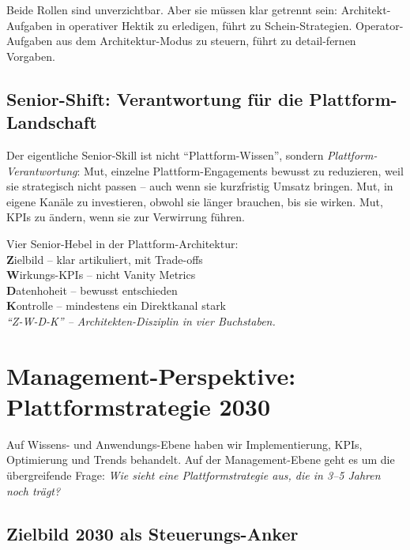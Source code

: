 \documentclass[11pt,a4paper,oneside]{article}
\newcommand{\caveatfontfallback}{\itshape}
\newcommand\caveatfont{\caveatfontfallback}%
\newcommand{\akzent}[1]{{\caveatfont\color{lpAmber}#1}}
\begin{document}
\medskip

\noindent Beide Rollen sind unverzichtbar. Aber sie müssen klar getrennt sein: Architekt-Aufgaben in operativer Hektik zu erledigen, führt zu Schein-Strategien. Operator-Aufgaben aus dem Architektur-Modus zu steuern, führt zu detail-fernen Vorgaben.

\subsection{Senior-Shift: Verantwortung für die Plattform-Landschaft}

Der eigentliche Senior-Skill ist nicht ``Plattform-Wissen'', sondern \emph{Plattform-Verantwortung}: Mut, einzelne Plattform-Engagements bewusst zu reduzieren, weil sie strategisch nicht passen -- auch wenn sie kurzfristig Umsatz bringen. Mut, in eigene Kanäle zu investieren, obwohl sie länger brauchen, bis sie wirken. Mut, KPIs zu ändern, wenn sie zur Verwirrung führen.

\begin{eselsbox}[Eselsbrücke: \akzent{Z-W-D-K}]
Vier Senior-Hebel in der Plattform-Architektur:\\[2pt]
\textbf{Z}ielbild -- klar artikuliert, mit Trade-offs\\
\textbf{W}irkungs-KPIs -- nicht Vanity Metrics\\
\textbf{D}atenhoheit -- bewusst entschieden\\
\textbf{K}ontrolle -- mindestens ein Direktkanal stark\\[2pt]
\emph{``Z-W-D-K'' -- Architekten-Disziplin in vier Buchstaben.}
\end{eselsbox}

\section{Management-Perspektive: Plattformstrategie 2030}

Auf Wissens- und Anwendungs-Ebene haben wir Implementierung, KPIs, Optimierung und Trends behandelt. Auf der Management-Ebene geht es um die übergreifende Frage: \emph{Wie sieht eine Plattformstrategie aus, die in 3--5 Jahren noch trägt?}

\subsection{Zielbild 2030 als Steuerungs-Anker}
\end{document}
